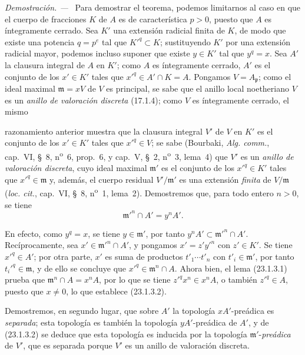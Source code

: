 \documentclass[10pt,oneside]{book}
\newcommand{\oldpage}[2][]{%
  \setcounter{footnote}{0}%
  \marginpar{\scriptsize\textbf{#1}~|~#2}\ignorespaces}
\newenvironment{proof}{%
  \par\medskip\noindent\textit{Demostración. ---\ }}{\par}
\begin{document}
\begin{proof}
Para demostrar el teorema, podemos limitarnos al caso en que el cuerpo de fracciones
$K$ de $A$ es de característica $p>0$, puesto que $A$ es íntegramente cerrado.
Sea $K'$ una extensión radicial finita de $K$, de modo que existe una
potencia $q=p^e$ tal que $K'^q\subset K$; sustituyendo $K'$ por una
extensión radicial mayor, podemos incluso suponer que existe $y\in K'$ tal
que $y^q=x$. Sea $A'$ la clausura integral de $A$ en $K'$; como
$A$ es íntegramente cerrado, $A'$ es el conjunto de los $x'\in K'$ tales que
$x'^q\in A'\cap K=A$. Pongamos $V=A_{\mathfrak p}$; como el ideal maximal
$\mathfrak m=xV$ de $V$ es principal, se sabe que el anillo local
noetheriano $V$ es un \emph{anillo de valoración discreta} (17.1.4); como
$V$ es íntegramente cerrado, el mismo

\oldpage[0\textsubscript{IV-1}]{215}

razonamiento anterior muestra que la clausura integral $V'$ de $V$ en
$K'$ es el conjunto de los $x'\in K'$ tales que $x'^q\in V$; se sabe
(Bourbaki, \emph{Alg. comm.}, cap.~VI, §~8, n\textsuperscript{o}~6,
prop.~6, y cap.~V, §~2, n\textsuperscript{o}~3, lema~4) que $V'$ es un
\emph{anillo de valoración discreta}, cuyo ideal maximal $\mathfrak m'$ es
el conjunto de los $x'^q\in K'$ tales que $x'^q\in\mathfrak m$ y, además, el cuerpo
residual $V'/\mathfrak m'$ es una extensión \emph{finita} de
$V/\mathfrak m$ (\emph{loc. cit.}, cap.~VI, §~8,
n\textsuperscript{o}~1, lema~2). Demostremos que, para todo entero $n>0$, se tiene
\begin{equation}
\label{0.23.1.3.2-es}
  \mathfrak m'^n\cap A'=y^nA'.
  \tag{23.1.3.2}
\end{equation}

En efecto, como $y^q=x$, se tiene $y\in\mathfrak m'$, por tanto
$y^nA'\subset\mathfrak m'^n\cap A'$. Recíprocamente, sea
$x'\in\mathfrak m'^n\cap A'$, y pongamos $x'=z'y'^n$ con $z'\in K'$. Se tiene
$x'^q\in A'$; por otra parte, $x'$ es suma de productos
$t'_1\cdots t'_n$ con $t'_i\in\mathfrak m'$, por tanto
$t_i'^q\in\mathfrak m$, y de ello se concluye que
$x'^q\in\mathfrak m^n\cap A$. Ahora bien, el lema (23.1.3.1) prueba que
$\mathfrak m^n\cap A=x^nA$, por lo que se tiene $z'^qx^n\in x^nA$, o también
$z'^q\in A$, puesto que $x\neq0$, lo que establece (23.1.3.2).

Demostremos, en segundo lugar, que sobre $A'$ la topología $xA'$-preádica es
\emph{separada}; esta topología es también la topología $yA'$-preádica de
$A'$, y de (23.1.3.2) se deduce que esta topología es inducida por la
topología $\mathfrak m'$-\emph{preádica} de $V'$, que es separada porque $V'$ es
un anillo de valoración discreta.


\end{proof}
\end{document}
